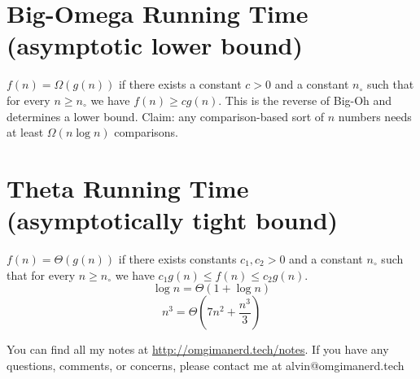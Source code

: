 \documentclass{math}
\begin{document}
\section*{Big-Omega Running Time (asymptotic lower bound)}
\( f(n) = \Omega(g(n)) \) if there exists a constant \( c > 0 \) and a constant
\( n_{\circ} \) such that for every \( n \geq n_{\circ} \) we have
\( f(n) \geq cg(n) \). This is the reverse of Big-Oh and determines a lower
bound. Claim: any comparison-based sort of \( n \) numbers needs at least
\( \Omega(n\log n) \) comparisons.

\section*{Theta Running Time (asymptotically tight bound)}
\( f(n) = \Theta(g(n)) \) if there exists constants \( c_{1},c_{2} > 0 \) and
a constant \( n_{\circ} \) such that for every \( n \geq n_{\circ} \) we have
\( c_{1}g(n) \leq f(n) \leq c_{2}g(n) \).
\[ \log n = \Theta(1+\log n) \]
\[ n^3 = \Theta(7n^2+\frac{n^3}{3}) \]

\begin{center}
  You can find all my notes at \url{http://omgimanerd.tech/notes}. If you have
  any questions, comments, or concerns, please contact me at
  alvin@omgimanerd.tech
\end{center}
\end{document}
